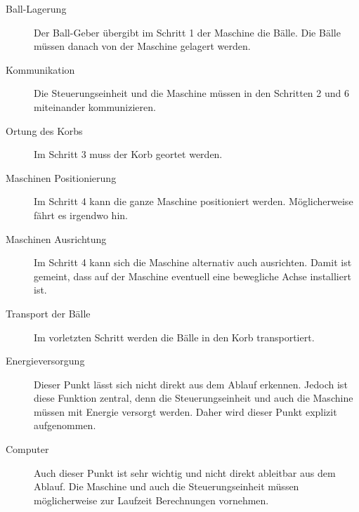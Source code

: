 \begin{description}
    \item [Ball-Lagerung] Der Ball-Geber übergibt im Schritt 1 der 
        Maschine die Bälle. Die Bälle müssen danach von der Maschine 
        gelagert werden.
    \item [Kommunikation] Die Steuerungseinheit und die Maschine müssen 
        in den Schritten 2 und 6 miteinander kommunizieren.
    \item [Ortung des Korbs] Im Schritt 3 muss der Korb geortet werden.
    \item [Maschinen Positionierung] Im Schritt 4 kann die ganze Maschine
    positioniert werden. Möglicherweise fährt es irgendwo hin.
    \item [Maschinen Ausrichtung] Im Schritt 4 kann sich die Maschine alternativ
    auch ausrichten. Damit ist gemeint, dass auf der Maschine eventuell
    eine bewegliche Achse installiert ist.
    \item [Transport der Bälle] Im vorletzten Schritt werden die Bälle 
        in den Korb transportiert.
    \item [Energieversorgung] Dieser Punkt lässt sich nicht direkt aus 
        dem Ablauf erkennen. Jedoch ist diese Funktion zentral, denn 
        die Steuerungseinheit und auch die Maschine müssen mit Energie 
        versorgt werden. Daher wird dieser Punkt explizit aufgenommen.
    \item [Computer] Auch dieser Punkt ist sehr wichtig und nicht direkt 
        ableitbar aus dem Ablauf. Die Maschine und auch die 
        Steuerungseinheit müssen möglicherweise zur Laufzeit Berechnungen vornehmen.
\end{description}
